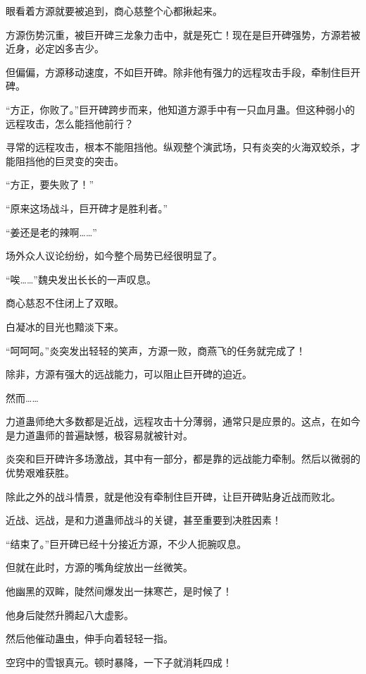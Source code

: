 
\begin{this_body}



眼看着方源就要被追到，商心慈整个心都揪起来。

方源伤势沉重，被巨开碑三龙象力击中，就是死亡！现在是巨开碑强势，方源若被近身，必定凶多吉少。

但偏偏，方源移动速度，不如巨开碑。除非他有强力的远程攻击手段，牵制住巨开碑。

“方正，你败了。”巨开碑跨步而来，他知道方源手中有一只血月蛊。但这种弱小的远程攻击，怎么能挡他前行？

寻常的远程攻击，根本不能阻挡他。纵观整个演武场，只有炎突的火海双蛟杀，才能阻挡他的巨灵变的突击。

“方正，要失败了！”

“原来这场战斗，巨开碑才是胜利者。”

“姜还是老的辣啊……”

场外众人议论纷纷，如今整个局势已经很明显了。

“唉……”魏央发出长长的一声叹息。

商心慈忍不住闭上了双眼。

白凝冰的目光也黯淡下来。

“呵呵呵。”炎突发出轻轻的笑声，方源一败，商燕飞的任务就完成了！

除非，方源有强大的远战能力，可以阻止巨开碑的迫近。

然而……

力道蛊师绝大多数都是近战，远程攻击十分薄弱，通常只是应景的。这点，在如今是力道蛊师的普遍缺憾，极容易就被针对。

炎突和巨开碑许多场激战，其中有一部分，都是靠的远战能力牵制。然后以微弱的优势艰难获胜。

除此之外的战斗情景，就是他没有牵制住巨开碑，让巨开碑贴身近战而败北。

近战、远战，是和力道蛊师战斗的关键，甚至重要到决胜因素！

“结束了。”巨开碑已经十分接近方源，不少人扼腕叹息。

但就在此时，方源的嘴角绽放出一丝微笑。

他幽黑的双眸，陡然间爆发出一抹寒芒，是时候了！

他身后陡然升腾起八大虚影。

然后他催动蛊虫，伸手向着轻轻一指。

空窍中的雪银真元。顿时暴降，一下子就消耗四成！


\end{this_body}
